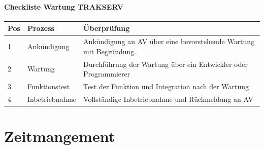 \documentclass[a4paper,10pt]{scrartcl}
\begin{document}
\paragraph{\large{Checkliste Wartung TRAKSERV}}
\begin{flushleft}
\begin{tabular}{lll} 
\toprule
\textbf{Pos} & \textbf{Prozess} & \textbf{Überprüfung}\\ 
\midrule 
\midrule
1  & Ankündigung & Ankündigung an AV über eine bevorstehende Wartung mit Begründung. \\
\midrule
2  & Wartung & Durchführung der Wartung über ein Entwickler oder Programmierer \\
\midrule
3  & Funktionstest & Test der Funktion und Integration nach der Wartung \\
\midrule
4  & Inbetriebnahme & Vollständige Inbetriebnahme und Rückmeldung an AV\\
\bottomrule
\end{tabular}
\end{flushleft}


\section{Zeitmangement}
\end{document}
